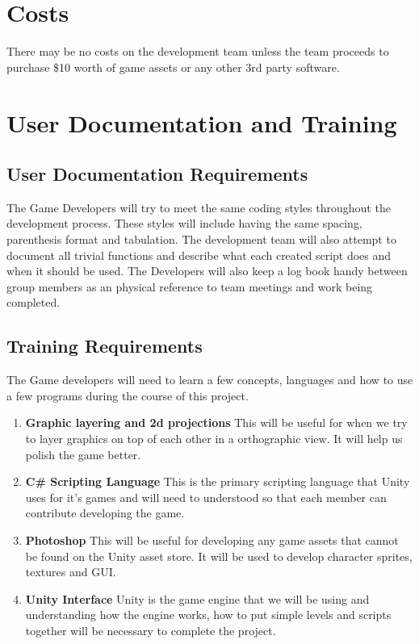 \documentclass{article}
\begin{document}
\section{Costs}
\quad There may be no costs on the development team unless the team proceeds to purchase \$10 worth of game assets or any other 3rd party software.
\section{User Documentation and Training}
\subsection{User Documentation Requirements}
\quad The Game Developers will try to meet the same coding styles throughout the development process. These styles will include having the same spacing, parenthesis format and tabulation. The development team will also attempt to document all trivial functions and describe what each created script does and when it should be used. The Developers will also keep a log book handy between group members as an physical reference to team meetings and work being completed.
\subsection{Training Requirements}
\quad The Game developers will need to learn a few concepts, languages and how to use a few programs during the course of this project.
\begin{enumerate}
	\item \textbf{Graphic layering and 2d projections} This will be useful for when we try to layer graphics on top of each other in a orthographic view. It will help us polish the game better.
	\item \textbf{C\# Scripting Language} This is the primary scripting language that Unity uses for it's games and will need to understood so that each member can contribute developing the game.
	\item \textbf{Photoshop} This will be useful for developing any game assets that cannot be found on the Unity asset store. It will be used to develop character sprites, textures and GUI.
	\item \textbf{Unity Interface} Unity is the game engine that we will be using and understanding how the engine works, how to put simple levels and scripts together will be necessary to complete the project.
\end{enumerate}
\end{document}
